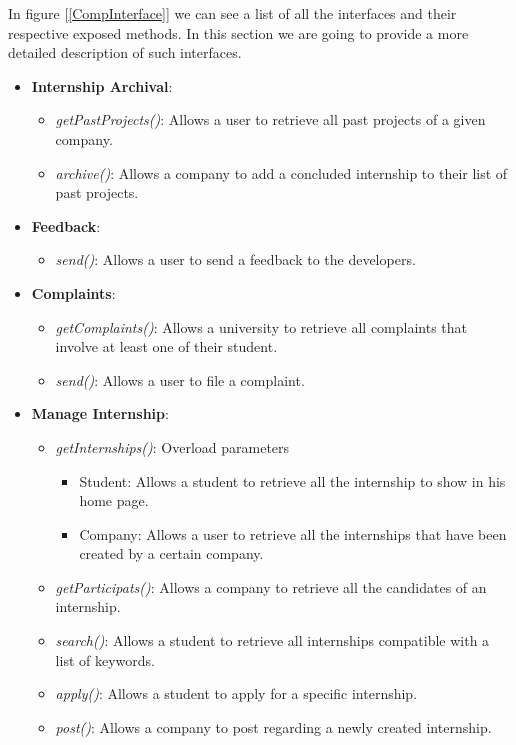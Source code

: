 \documentclass[11pt,twoside]{article}
\begin{document}
\newpage	

In figure [\ref{CompInterface}] we can see a list of all the interfaces and their respective exposed methods. In this section we are going to provide a more detailed description of such interfaces.
\begin{itemize}
\item \textbf{Internship Archival}:
	\begin{itemize}
	\item \textit{getPastProjects()}: Allows a user to retrieve all past projects of a given company.
	\item \textit{archive()}: Allows a company to add a concluded internship to their list of past projects.
	\end{itemize}
	
\item \textbf{Feedback}:
	\begin{itemize}
	\item \textit{send()}: Allows a user to send a feedback to the developers.
	\end{itemize}
	
\item \textbf{Complaints}:
	\begin{itemize}
	\item \textit{getComplaints()}: Allows a university to retrieve all complaints that involve at least one of their student.
	\item \textit{send()}: Allows a user to file a complaint.
	\end{itemize}
	
\item \textbf{Manage Internship}:
	\begin{itemize}
	\item \textit{getInternships()}: Overload parameters
		\begin{itemize}
		\item Student: Allows a student to retrieve all the internship to show in his home page.
		\item Company: Allows a user to retrieve all the internships that have been created by a certain company.
		\end{itemize}
	\item \textit{getParticipats()}: Allows a company to retrieve all the candidates of an internship.
	\item \textit{search()}: Allows a student to retrieve all internships compatible with a list of keywords.
	\item \textit{apply()}: Allows a student to apply for a specific internship.
	\item \textit{post()}: Allows a company to post regarding a newly created internship.
	\end{itemize}
	

\end{itemize}
\end{document}

